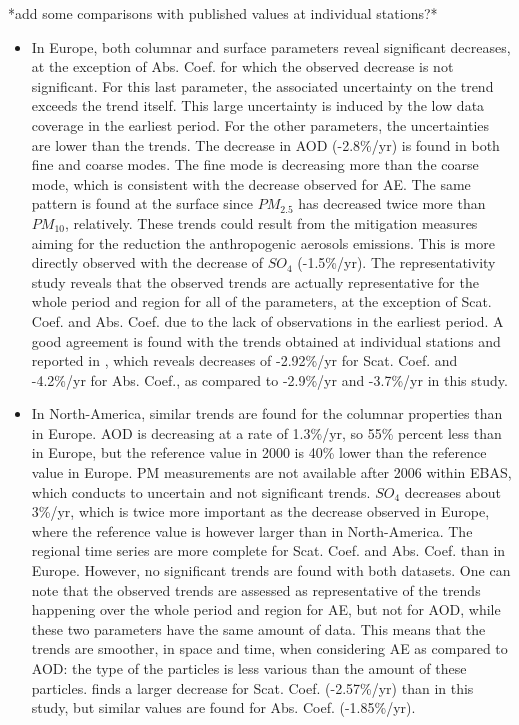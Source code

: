 \documentclass[journal abbreviation, manuscript]{copernicus}
\begin{document}
*add some comparisons with published values at individual stations?*
\begin{itemize}
 \item In Europe, both columnar and surface parameters reveal significant decreases, at the exception of Abs. Coef. for which the observed decrease is not significant. For this last parameter, the associated uncertainty on the trend exceeds the trend itself. This large uncertainty is induced by the low data coverage in the earliest period. For the other parameters, the uncertainties are lower than the trends. The decrease in AOD (-2.8\%/yr) is found in both fine and coarse modes. The fine mode is decreasing more than the coarse mode, which is consistent with the decrease observed for AE. The same pattern is found at the surface since $PM_{2.5}$ has decreased twice more than $PM_{10}$, relatively. These trends could result from the mitigation measures aiming for the reduction the anthropogenic aerosols emissions. This is more directly observed with the decrease of $SO_{4}$ (-1.5\%/yr). The representativity study reveals that the observed trends are actually representative for the whole period and region for all of the parameters, at the exception of Scat. Coef. and Abs. Coef. due to the lack of observations in the earliest period. A good agreement is found with the trends obtained at individual stations and reported in \cite{collaudcoenprep}, which reveals decreases of -2.92\%/yr for Scat. Coef. and -4.2\%/yr for Abs. Coef., as compared to -2.9\%/yr and -3.7\%/yr in this study.
 \item In North-America, similar trends are found for the columnar properties than in Europe. AOD is decreasing at a rate of 1.3\%/yr, so 55\% percent less than in Europe, but the reference value in 2000 is 40\% lower than the reference value in Europe. PM measurements are not available after 2006 within EBAS, which conducts to uncertain and not significant trends. $SO_{4}$ decreases about 3\%/yr, which is twice more important as the decrease observed in Europe, where the reference value is however larger than in North-America. The regional time series are more complete for Scat. Coef. and Abs. Coef. than in Europe. However, no significant trends are found with both datasets. One can note that the observed trends are assessed as representative of the trends happening over the whole period and region for AE, but not for AOD, while these two parameters have the same amount of data. This means that the trends are smoother, in space and time, when considering AE as compared to AOD: the type of the particles is less various than the amount of these particles. \cite{collaudcoenprep} finds a larger decrease for Scat. Coef. (-2.57\%/yr) than in this study, but similar values are found for Abs. Coef. (-1.85\%/yr). 

\end{itemize}
\end{document}
